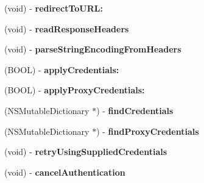 \begin{DoxyCompactItemize}
\item 
\hypertarget{interface_a_s_i_h_t_t_p_request_aed0a9ab6a8ca190bb26bb249c2a4ea50}{
(void) -\/ {\bfseries redirect\-To\-U\-R\-L\-:}}
\label{interface_a_s_i_h_t_t_p_request_aed0a9ab6a8ca190bb26bb249c2a4ea50}

\item 
\hypertarget{interface_a_s_i_h_t_t_p_request_abf63487739ee540915b40d3cace04c63}{
(void) -\/ {\bfseries read\-Response\-Headers}}
\label{interface_a_s_i_h_t_t_p_request_abf63487739ee540915b40d3cace04c63}

\item 
\hypertarget{interface_a_s_i_h_t_t_p_request_a4820891389ebf2eda587ff809b0e6bc2}{
(void) -\/ {\bfseries parse\-String\-Encoding\-From\-Headers}}
\label{interface_a_s_i_h_t_t_p_request_a4820891389ebf2eda587ff809b0e6bc2}

\item 
\hypertarget{interface_a_s_i_h_t_t_p_request_ade60b6e81c57c8ee8b616200ccb22930}{
(\-B\-O\-O\-L) -\/ {\bfseries apply\-Credentials\-:}}
\label{interface_a_s_i_h_t_t_p_request_ade60b6e81c57c8ee8b616200ccb22930}

\item 
\hypertarget{interface_a_s_i_h_t_t_p_request_a53e09e81268eb7230b4b5498ed2eb7d1}{
(\-B\-O\-O\-L) -\/ {\bfseries apply\-Proxy\-Credentials\-:}}
\label{interface_a_s_i_h_t_t_p_request_a53e09e81268eb7230b4b5498ed2eb7d1}

\item 
\hypertarget{interface_a_s_i_h_t_t_p_request_af337cbd50189506479260c6069ca2ded}{
(\-N\-S\-Mutable\-Dictionary $\ast$) -\/ {\bfseries find\-Credentials}}
\label{interface_a_s_i_h_t_t_p_request_af337cbd50189506479260c6069ca2ded}

\item 
\hypertarget{interface_a_s_i_h_t_t_p_request_aee0699cfb5ba5749a1461dfa56440121}{
(\-N\-S\-Mutable\-Dictionary $\ast$) -\/ {\bfseries find\-Proxy\-Credentials}}
\label{interface_a_s_i_h_t_t_p_request_aee0699cfb5ba5749a1461dfa56440121}

\item 
\hypertarget{interface_a_s_i_h_t_t_p_request_aad1efa3b1bc64006cc033bd0d4eee7cc}{
(void) -\/ {\bfseries retry\-Using\-Supplied\-Credentials}}
\label{interface_a_s_i_h_t_t_p_request_aad1efa3b1bc64006cc033bd0d4eee7cc}

\item 
\hypertarget{interface_a_s_i_h_t_t_p_request_a25d3d77f917c5f8b9956f6a45022dae2}{
(void) -\/ {\bfseries cancel\-Authentication}}
\label{interface_a_s_i_h_t_t_p_request_a25d3d77f917c5f8b9956f6a45022dae2}


\end{DoxyCompactItemize}
